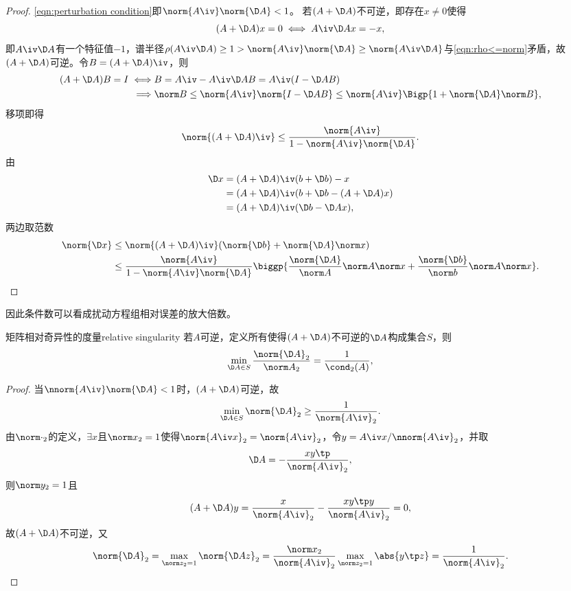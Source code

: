 \begin{proof}
    \eqref{eqn:perturbation condition}即$\norm{A\iv}\norm{\D A}<1$。
    若$(A+\D A)$不可逆，即存在$x\neq 0$使得
    \[
        (A+\D A)x=0\iff A\iv\D A x=-x,
    \]
    即$A\iv\D A$有一个特征值$-1$，谱半径$\rho(A\iv\D A)\geq 1>\norm{A\iv}\norm{\D A}\geq\norm{A\iv\D A}$与\eqref{eqn:rho<=norm}矛盾，故$(A+\D A)$可逆。令$B=(A+\D A)\iv$，则
    \begin{align*}
        (A+\D A)B=I\iff&B=A\iv-A\iv\D AB=A\iv(I-\D AB)\\
        \implies&\norm B\leq\norm{A\iv}\norm{I-\D AB}\leq\norm{A\iv}\Bigp{1+\norm{\D A}\norm B},
    \end{align*}
    移项即得
    \begin{equation}
        \norm{(A+\D A)\iv}\leq\frac{\norm{A\iv}}{1-\norm{A\iv}\norm{\D A}}.
    \end{equation}
    由
    \begin{align*}
        \D x&=(A+\D A)\iv(b+\D b)-x\\
        &=(A+\D A)\iv(b+\D b-(A+\D A)x)\\
        &=(A+\D A)\iv(\D b-\D Ax),
    \end{align*}
    两边取范数
    \begin{align*}
        \norm{\D x}&\leq\norm{(A+\D A)\iv}(\norm{\D b}+\norm{\D A}\norm x)\\
        &\leq\frac{\norm{A\iv}}{1-\norm{A\iv}\norm{\D A}}\biggp{\frac{\norm{\D A}}{\norm A}\norm A\norm x+\frac{\norm{\D b}}{\norm b}\norm A\norm x}.
        \qedhere
    \end{align*}
\end{proof}

\begin{remark}
    因此条件数可以看成扰动方程组相对误差的放大倍数。
\end{remark}

\begin{theorem}
    {矩阵相对奇异性的度量}{relative singularity}
    若$A$可逆，定义所有使得$(A+\D A)$不可逆的$\D A$构成集合$S$，则 
    \begin{equation}
        \min_{\D A\in S}\frac{\norm{\D A}_2}{\norm A_2}=\frac1{\cond_2(A)},
    \end{equation}
\end{theorem}

\begin{proof}
    当$\nnorm{A\iv}\norm{\D A}<1$时，$(A+\D A)$可逆，故
    \[
        \min_{\D A\in S}\norm{\D A}_2\geq\frac1{\norm{A\iv}_2}.
    \]
    由$\norm\cdot_2$的定义，$\exists x$且$\norm x_2=1$使得$\norm{A\iv x}_2=\norm{A\iv}_2$，令$y=A\iv x/\nnorm{A\iv}_2$，并取
    \[
        \D A=-\frac{xy\tp}{\norm{A\iv}_2},
    \]
    则$\norm y_2=1$且
    \[
        (A+\D A)y=\frac{x}{\norm{A\iv}_2}-\frac{xy\tp y}{\norm{A\iv}_2}=0,
    \]
    故$(A+\D A)$不可逆，又
    \[
        \norm{\D A}_2=\max_{\norm z_2=1}\norm{\D Az}_2=\frac{\norm x_2}{\norm{A\iv}_2}\max_{\norm z_2=1}\abs{y\tp z}=\frac1{\norm{A\iv}_2}.
        \qedhere
    \]
\end{proof}

